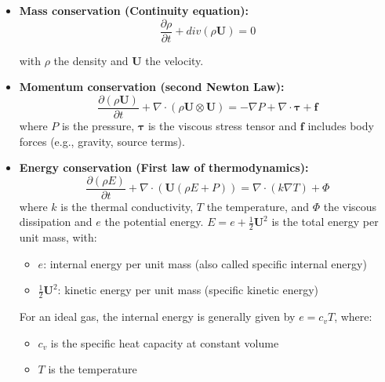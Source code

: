 \begin{itemize}
    \item \textbf{Mass conservation (Continuity equation):}
    \begin{equation}
        \frac{\partial \rho}{\partial t} + div(\rho \mathbf{U}) = 0   %
        \label{eq:mass_conservation}
    \end{equation}

    with $\rho$ the density and $\mathbf{U}$ the velocity.

    \item \textbf{Momentum conservation (second Newton Law):}     %
    \begin{equation}
        \frac{\partial (\rho \mathbf{U})}{\partial t} + \nabla \cdot (\rho \mathbf{U} \otimes \mathbf{U}) = -\nabla P + \nabla \cdot \boldsymbol{\tau} + \mathbf{f}
    \end{equation}
    where $P$ is the pressure, \( \boldsymbol{\tau} \) is the viscous stress tensor and \( \mathbf{f} \) includes body forces (e.g., gravity, source terms).

    \item \textbf{Energy conservation (First law of thermodynamics):}
    \begin{equation}
        \frac{\partial (\rho E)}{\partial t} + \nabla \cdot (\mathbf{U} (\rho E + P)) = \nabla \cdot (k \nabla T) + \Phi
    \end{equation}
    where \( k \) is the thermal conductivity, \( T \) the temperature, and \( \Phi \) the viscous dissipation and $e$ the potential energy.
    $E = e + \frac{1}{2} \boldsymbol{U}^2$ is the total energy per unit mass, with:

    \begin{itemize}
        \item $e$: internal energy per unit mass (also called specific internal energy)
        \item $\frac{1}{2} \boldsymbol{U}^2$: kinetic energy per unit mass (specific kinetic energy)
    \end{itemize}

    For an ideal gas, the internal energy is generally given by $e = c_v T$, where:
    \begin{itemize}
        \item $c_v$ is the specific heat capacity at constant volume
        \item $T$ is the temperature
    \end{itemize}
\end{itemize}

